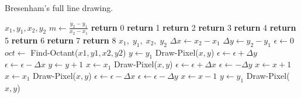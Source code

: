 \documentclass[a4paper]{article}
\begin{document}
\begin{algorithm}[H]
\caption{Bresenham's full line drawing.}
\label{alg:bres_pt2}
\begin{algorithmic}[1]
	 {$x_1,y_1,x_2,y_2$} 
	\State $m \leftarrow \frac{y_2-y_1}{x_2-x_1}$
		\State \textbf{return} 0 
		\State \textbf{return} 1 
		\State \textbf{return} 2
		\State \textbf{return} 3
		\State \textbf{return} 4
		\State \textbf{return} 5
		\State \textbf{return} 6
		\State \textbf{return} 7
	\Else {}
		\State \textbf{return} 8
	\EndIf
\EndProcedure
\State
{} {$x_1,\; y_1,\; x_2,\; y_2$} 
	\State $\Delta x \leftarrow x_2 - x_1$
	\State $\Delta y \leftarrow y_2 - y_1$
	\State $\epsilon \leftarrow 0$
	\State $oct \leftarrow$ Find-Octant($x1,y1,x2,y2$)
	 
		\State $y \leftarrow y_1$
			\State Draw-Pixel($x,y$)
			\State $\epsilon \leftarrow \epsilon + \Delta y$
				\State $\epsilon \leftarrow \epsilon - \Delta x$
				\State $y \leftarrow y + 1$
			\EndIf
		\EndFor
	 
		\State $x \leftarrow x_1$
			\State Draw-Pixel($x,y$)
			\State $\epsilon \leftarrow \epsilon + \Delta x$
				\State $\epsilon \leftarrow - \Delta y$
				\State $x \leftarrow x + 1$
			\EndIf
		\EndFor
	 
		\State $x \leftarrow x_1$
			\State Draw-Pixel($x,y$)
			\State $\epsilon \leftarrow \epsilon - \Delta x$
			\If { $2\epsilon \geq \Delta$}
				\State $\epsilon \leftarrow \epsilon - \Delta y$
				\State $x \leftarrow x - 1$
			\EndIf
		\EndFor
	  
		\State $y \leftarrow y_1$
			\State Draw-Pixel($x,y$)

		\EndFor
	\EndIf
\EndProcedure
\end{algorithmic}
\end{algorithm}
\end{document}
